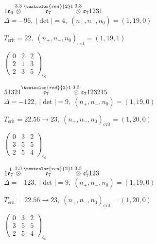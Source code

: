 \documentclass[10pt]{article}
\begin{document}
$1\mathfrak{e}_6\overset{3,3}{\otimes}\overset{\textcolor{red}{2}1}{\mathfrak{e}_7}\overset{3,3}{\otimes}\mathfrak{e}_71231$ \quad $\Delta=-96,\; |\det|=4,\; (n_+,n_-,n_0)=(1,19,0)$

\hspace{1em}$T_{\text{crit}}=22,\; (n_+,n_-,n_0)_{\text{crit}}=(1,19,1)$

\hspace{2em}$\left(\begin{smallmatrix}0 & 2 & 2 \\ 2 & 1 & 3 \\ 2 & 3 & 5\end{smallmatrix}\right)_{\!b_0}$

\smallskip

$51321\overset{\textcolor{red}{2}1}{\mathfrak{e}_7}\overset{3,3}{\otimes}\mathfrak{e}_7123215$ \quad $\Delta=-122,\; |\det|=9,\; (n_+,n_-,n_0)=(1,19,0)$

\hspace{1em}$T_{\text{crit}}=22.56 \to 23,\; (n_+,n_-,n_0)_{\text{crit}}=(1,20,0)$

\hspace{2em}$\left(\begin{smallmatrix}0 & 3 & 2 \\ 3 & 5 & 5 \\ 2 & 5 & 4\end{smallmatrix}\right)_{\!b_0}$

\smallskip

$1\overset{1}{\mathfrak{e}_7}\overset{3,3}{\otimes}\overset{\textcolor{red}{2}1}{\mathfrak{e}_7}\overset{3,3}{\otimes}\mathfrak{e}_7'123$ \quad $\Delta=-123,\; |\det|=9,\; (n_+,n_-,n_0)=(1,19,0)$

\hspace{1em}$T_{\text{crit}}=22.56 \to 23,\; (n_+,n_-,n_0)_{\text{crit}}=(1,20,0)$

\hspace{2em}$\left(\begin{smallmatrix}0 & 3 & 2 \\ 3 & 5 & 5 \\ 2 & 5 & 4\end{smallmatrix}\right)_{\!b_0}$

\smallskip
\end{document}
